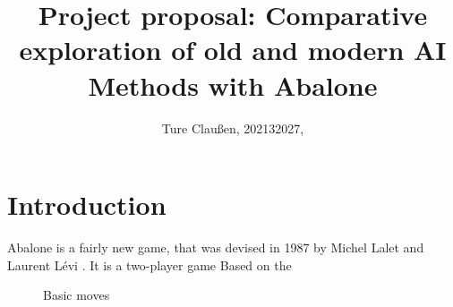 \documentclass{llncs}
\begin{document}
\title{Project proposal: Comparative exploration of old and modern AI Methods with Abalone}
\author{Ture Claußen, 202132027, }

{\def\addcontentsline#1#2#3{}\maketitle} %

\begin{abstract}

\end{abstract}

\section{Introduction}

Abalone is a fairly new game, that was devised in 1987 by Michel Lalet and Laurent Lévi \cite{noauthor_abalone_2020}. It is a two-player game
Based on the \cite{russell_artificial_2021}

\begin{figure}[!h]
  \centering
  \hfill
  \caption{Basic moves \cite{abalone_sa_abalone_nodate}}
\end{figure}
\end{document}
